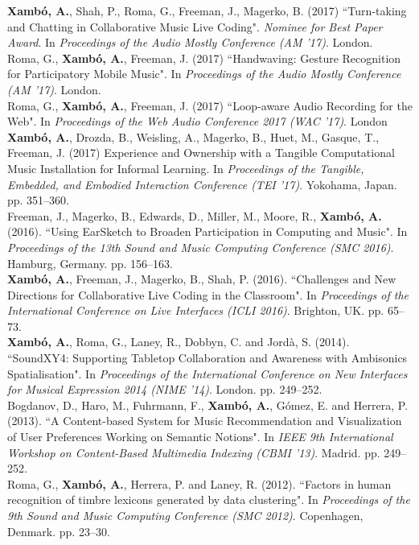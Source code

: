 \documentclass[10pt, a4paper]{article}
\newcommand{\years}[1]{\marginnote{\scriptsize #1}}
\begin{document}
\years{2017d}\textbf{Xambó, A.}, Shah, P., Roma, G., Freeman, J., Magerko, B. (2017) “Turn-taking and Chatting in Collaborative Music Live Coding". \emph{Nominee for Best Paper Award}. In \emph{Proceedings of the Audio Mostly Conference (AM '17)}. London.\\ 
\years{2017c}Roma, G., \textbf{Xambó, A.}, Freeman, J. (2017) “Handwaving: Gesture Recognition for Participatory Mobile Music". In \emph{Proceedings of the Audio Mostly Conference (AM '17)}. London.\\
\years{2017b}Roma, G., \textbf{Xambó, A.}, Freeman, J. (2017) “Loop-aware Audio Recording for the Web". In \emph{Proceedings of the Web Audio Conference 2017 (WAC '17)}. London\\ 
\years{2017a}\textbf{Xambó, A.}, Drozda, B., Weisling, A., Magerko, B., Huet, M., Gasque, T., Freeman, J. (2017) Experience and Ownership with a Tangible Computational Music Installation for Informal Learning. In \emph{Proceedings of the Tangible, Embedded, and Embodied Interaction Conference (TEI '17)}. Yokohama, Japan. pp. 351--360.\\ 
\years{2016b}Freeman, J., Magerko, B., Edwards, D., Miller, M., Moore, R., \textbf{Xambó, A.} (2016). “Using EarSketch to Broaden Participation in Computing and Music". In \emph{Proceedings of the 13th Sound and Music Computing Conference (SMC 2016)}. Hamburg, Germany. pp. 156--163.\\
\years{2016a}\textbf{Xambó, A.}, Freeman, J., Magerko, B., Shah, P. (2016). “Challenges and New Directions for Collaborative Live Coding in the Classroom". In \emph{Proceedings of the International Conference on Live Interfaces (ICLI 2016)}. Brighton, UK. pp. 65--73.\\
\years{2014}\textbf{Xambó, A.}, Roma, G., Laney, R., Dobbyn, C. and Jordà, S. (2014). “SoundXY4: Supporting Tabletop Collaboration and Awareness with Ambisonics Spatialisation". In \emph{Proceedings of the International Conference on New Interfaces for Musical Expression 2014 (NIME '14)}. London. pp. 249--252.\\
\years{2013}Bogdanov, D., Haro, M., Fuhrmann, F., \textbf{Xambó, A.}, Gómez, E. and Herrera, P. (2013). “A Content-based System for Music Recommendation and Visualization of User Preferences Working on Semantic Notions". In \emph{IEEE 9th International Workshop on Content-Based Multimedia Indexing (CBMI '13)}. Madrid. pp. 249--252.\\
\years{2012}Roma, G., \textbf{Xambó, A.}, Herrera, P. and Laney, R. (2012). “Factors in human recognition of timbre lexicons generated by data clustering". In \emph{Proceedings of the 9th Sound and Music Computing Conference (SMC 2012)}. Copenhagen, Denmark. pp. 23--30.\\
\end{document}
